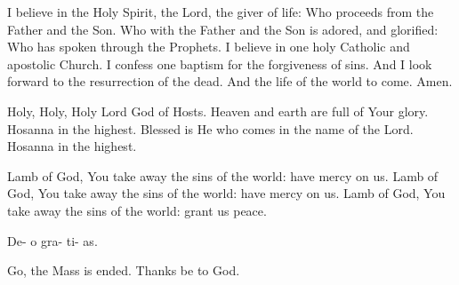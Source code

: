 \documentclass[11pt]{article} %
\begin{document}
I believe in the Holy Spirit, the Lord, the giver of life:  Who proceeds from the Father and the Son.  Who with the Father and the Son is adored, and glorified:  Who has spoken through the Prophets.  I believe in one holy Catholic and apostolic Church.  I confess one baptism for the forgiveness of sins.  And I look forward to the resurrection of the dead.  And the life of the world to come.  Amen.

\vskip20pt

Holy, Holy, Holy Lord God of Hosts.  Heaven and earth are full of Your glory.  Hosanna in the highest.  Blessed is He who comes in the name of the Lord.  Hosanna in the highest.

\vskip20pt

Lamb of God, You take away the sins of the world: have mercy on us.  Lamb of God, You take away the sins of the world: have mercy on us.  Lamb of God, You take away the sins of the world: grant us peace.

\vskip20pt

\hspace{8.3pt} De-\hspace{7.2pt} o\hspace{50.2pt} gra-\hspace{3.7pt} ti-\hspace{0.7pt} as.

Go, the Mass is ended.  Thanks be to God.
\end{document}
